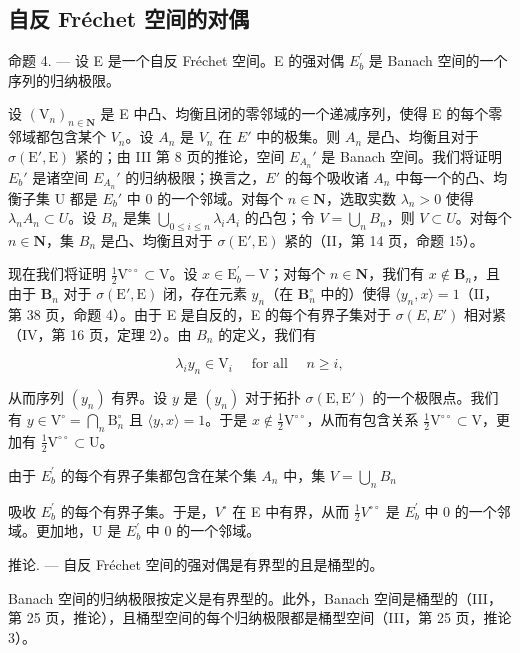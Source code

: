 \subsection{自反 Fréchet 空间的对偶}

命题 4. --- 设 E 是一个自反 Fréchet 空间。E 的强对偶 \(E_{b}^{\prime}\) 是 Banach 空间的一个序列的归纳极限。

设 \((\mathrm{V}_{n})_{n\in\mathbf{N}}\) 是 E 中凸、均衡且闭的零邻域的一个递减序列，使得 E 的每个零邻域都包含某个 \(V_{n}\)。设 \(A_{n}\) 是 \(V_{n}\) 在 \(E'\) 中的极集。则 \(A_{n}\) 是凸、均衡且对于 \(\sigma(\mathrm{E}',\mathrm{E})\) 紧的；由 III 第 8 页的推论，空间 \(E_{A_{n}}'\) 是 Banach 空间。我们将证明 \(E_{b}'\) 是诸空间 \(E_{A_{n}}'\) 的归纳极限；换言之，\(E'\) 的每个吸收诸 \(A_{n}\) 中每一个的凸、均衡子集 U 都是 \(E_{b}'\) 中 0 的一个邻域。对每个 \(n\in\mathbf{N}\)，选取实数 \(\lambda_{n}>0\) 使得 \(\lambda_{n}A_{n}\subset U\)。设 \(B_{n}\) 是集 \(\bigcup_{0\leqslant i\leqslant n}\lambda_{i}A_{i}\) 的凸包；令 \(V=\bigcup_{n}B_{n}\)，则 \(V\subset U\)。对每个 \(n\in\mathbf{N}\)，集 \(B_{n}\) 是凸、均衡且对于 \(\sigma(\mathrm{E}',\mathrm{E})\) 紧的（II，第 14 页，命题 15）。

现在我们将证明 \(\frac{1}{2}\mathrm{V}^{\circ \circ}\subset \mathrm{V}\)。设 \(x\in \mathrm{E}_b^\prime -\mathrm{V}\)；对每个 \(n\in \mathbf{N}\)，我们有 \(x\notin \mathbf{B}_n\)，且由于 \(\mathbf{B}_n\) 对于 \(\sigma (\mathrm{E}',\mathrm{E})\) 闭，存在元素 \(y_{n}\)（在 \(\mathbf{B}_n^\circ\) 中的）使得 \(\langle y_n, x \rangle = 1\)（II，第 38 页，命题 4）。由于 E 是自反的，E 的每个有界子集对于 \(\sigma(E, E')\) 相对紧（IV，第 16 页，定理 2）。由 \(B_n\) 的定义，我们有

\[
\lambda_ {i} y _ {n} \in \mathrm{V} _ {i} \quad \text { for   all } \quad n \geqslant i  ,\tag{3}
\]

从而序列 \((y_{n})\) 有界。设 \(y\) 是 \((y_{n})\) 对于拓扑 \(\sigma(\mathrm{E},\mathrm{E}')\) 的一个极限点。我们有 \(y\in\mathrm{V}^{\circ}=\bigcap_{n}\mathrm{B}_{n}^{\circ}\) 且 \(\langle y,x\rangle=1\)。于是 \(x\notin\frac{1}{2}\mathrm{V}^{\circ\circ}\)，从而有包含关系 \(\frac{1}{2}\mathrm{V}^{\circ\circ}\subset\mathrm{V}\)，更加有 \(\frac{1}{2}\mathrm{V}^{\circ\circ}\subset\mathrm{U}\)。

由于 \(E_{b}^{\prime}\) 的每个有界子集都包含在某个集 \(A_{n}\) 中，集 \(V = \bigcup_{n} B_{n}\)

吸收 \(E_{b}^{\prime}\) 的每个有界子集。于是，\(V^{\circ}\) 在 E 中有界，从而 \(\frac{1}{2}V^{\circ\circ}\) 是 \(E_{b}^{\prime}\) 中 0 的一个邻域。更加地，U 是 \(E_{b}^{\prime}\) 中 0 的一个邻域。

推论. --- 自反 Fréchet 空间的强对偶是有界型的且是桶型的。

Banach 空间的归纳极限按定义是有界型的。此外，Banach 空间是桶型的（III，第 25 页，推论），且桶型空间的每个归纳极限都是桶型空间（III，第 25 页，推论 3）。

